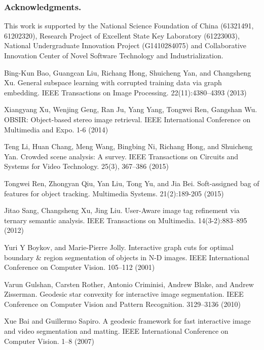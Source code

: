 \documentclass[runningheads,a4paper]{llncs}
\begin{document}
\subsubsection*{Acknowledgments.} This work is supported by the National Science Foundation of China (61321491, 61202320), Research Project of Excellent State Key Laboratory (61223003), National Undergraduate Innovation Project (G1410284075) and Collaborative Innovation Center of Novel Software Technology and Industrialization.

%
%
\begin{thebibliography}{4}

 Bing-Kun Bao, Guangcan Liu, Richang Hong, Shuicheng Yan, and Changsheng Xu. General subspace learning with corrupted training data via graph embedding. IEEE Transactions on Image Processing. 22(11):4380--4393 (2013)

 Xiangyang Xu, Wenjing Geng, Ran Ju, Yang Yang, Tongwei Ren, Gangshan Wu. OBSIR: Object-based stereo image retrieval. IEEE International Conference on Multimedia and Expo. 1-6 (2014)

 Teng Li, Huan Chang, Meng Wang, Bingbing Ni, Richang Hong, and Shuicheng Yan. Crowded scene analysis: A survey. IEEE Transactions on Circuits and Systems for Video Technology. 25(3), 367--386 (2015)

 Tongwei Ren, Zhongyan Qiu, Yan Liu, Tong Yu, and Jia Bei. Soft-assigned bag of features for object tracking. Multimedia Systems. 21(2):189-205 (2015)

 Jitao Sang, Changsheng Xu, Jing Liu. User-Aware image tag refinement via ternary semantic analysis. IEEE Transactions on Multimedia. 14(3-2):883--895 (2012)

 Yuri Y Boykov, and  Marie-Pierre Jolly. Interactive graph cuts for optimal boundary \& region segmentation of objects in N-D images. IEEE International Conference on Computer Vision. 105--112 (2001)

 Varun Gulshan, Carsten Rother, Antonio Criminisi, Andrew Blake, and Andrew Zisserman. Geodesic star convexity for interactive image segmentation. IEEE Conference on Computer Vision and Pattern Recognition. 3129--3136 (2010)
    
 Xue Bai and Guillermo Sapiro. A geodesic framework for fast interactive image and video segmentation and matting. IEEE International Conference on Computer Vision. 1--8 (2007)


\end{thebibliography}
\end{document}
